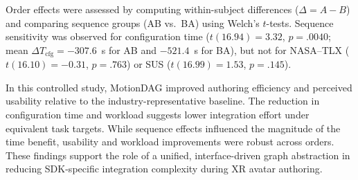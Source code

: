 Order effects were assessed by computing within-subject differences ($\Delta{=}A{-}B$) and comparing sequence groups (AB vs.\ BA) using Welch's $t$-tests.
Sequence sensitivity was observed for configuration time ($t(16.94)=3.32$, $p=.0040$; mean $\Delta T_{\mathrm{cfg}}=-307.6$~s for AB and $-521.4$~s for BA), but not for NASA--TLX ($t(16.10)=-0.31$, $p=.763$) or SUS ($t(16.99)=1.53$, $p=.145$).

In this controlled study, MotionDAG improved authoring efficiency and perceived usability relative to the industry-representative baseline. 
The reduction in configuration time and workload suggests lower integration effort under equivalent task targets. 
While sequence effects influenced the magnitude of the time benefit, usability and workload improvements were robust across orders.
These findings support the role of a unified, interface-driven graph abstraction in reducing SDK-specific integration complexity during XR avatar authoring.